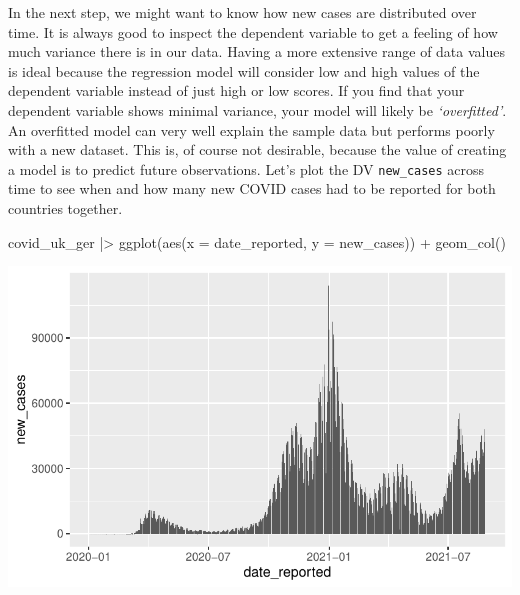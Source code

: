\documentclass[
  letterpaper,
]{krantz}
\makeatletter
\newenvironment{Shaded}{\begin{snugshade}}{\end{snugshade}}
\newcommand{\AttributeTok}[1]{\textcolor[rgb]{0.40,0.45,0.13}{#1}}
\newcommand{\FunctionTok}[1]{\textcolor[rgb]{0.28,0.35,0.67}{#1}}
\newcommand{\NormalTok}[1]{\textcolor[rgb]{0.00,0.23,0.31}{#1}}
\newcommand{\SpecialCharTok}[1]{\textcolor[rgb]{0.37,0.37,0.37}{#1}}
\newenvironment{kframe}{%
\medskip{}
\setlength{\fboxsep}{.8em}
 \def\at@end@of@kframe{}%
 \ifinner\ifhmode%
  \def\at@end@of@kframe{\end{minipage}}%
  \begin{minipage}{\columnwidth}%
 \fi\fi%
 \def\FrameCommand##1{\hskip\@totalleftmargin \hskip-\fboxsep
 \colorbox{shadecolor}{##1}\hskip-\fboxsep
     \hskip-\linewidth \hskip-\@totalleftmargin \hskip\columnwidth}%
 \MakeFramed {\advance\hsize-\width
   \@totalleftmargin\z@ \linewidth\hsize
   \@setminipage}}%
 {\par\unskip\endMakeFramed%
 \at@end@of@kframe}
\renewenvironment{Shaded}{\begin{kframe}}{\end{kframe}}
\makeatother
\begin{document}
In the next step, we might want to know how new cases are distributed
over time. It is always good to inspect the dependent variable to get a
feeling of how much variance there is in our data. Having a more
extensive range of data values is ideal because the regression model
will consider low and high values of the dependent variable instead of
just high or low scores. If you find that your dependent variable shows
minimal variance, your model will likely be \emph{`overfitted'}. An
overfitted model can very well explain the sample data but performs
poorly with a new dataset. This is, of course not desirable, because the
value of creating a model is to predict future observations. Let's plot
the DV \texttt{new\_cases} across time to see when and how many new
COVID cases had to be reported for both countries together.

\begin{Shaded}
\begin{Highlighting}[]
\NormalTok{covid\_uk\_ger }\SpecialCharTok{|\textgreater{}}
  \FunctionTok{ggplot}\NormalTok{(}\FunctionTok{aes}\NormalTok{(}\AttributeTok{x =}\NormalTok{ date\_reported,}
             \AttributeTok{y =}\NormalTok{ new\_cases)) }\SpecialCharTok{+}
  \FunctionTok{geom\_col}\NormalTok{()}
\end{Highlighting}
\end{Shaded}

\includegraphics{13_regressions_files/figure-latex/mr-plot-new-cases-1.pdf}
\end{document}
